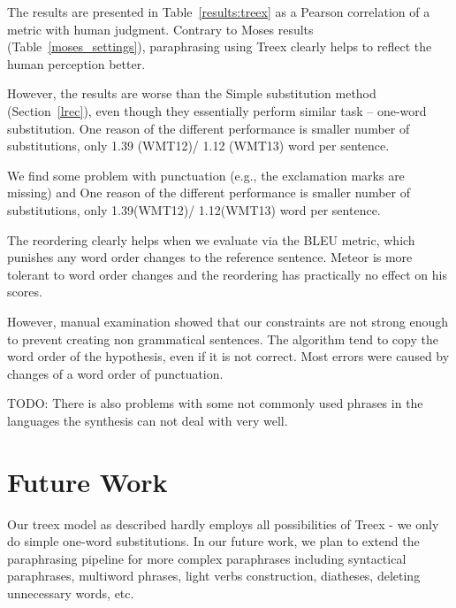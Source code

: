 \documentclass[11pt]{article}
\def\Tref#1{Table~\ref{#1}}
\def\Sref#1{Section~\ref{#1}}
\begin{document}
The results are presented in \Tref{results:treex} as a Pearson correlation of a 
metric with human judgment. Contrary to Moses results (\Tref{moses_settings}), 
paraphrasing using Treex clearly helps to reflect the human perception better. 

However, the results are worse than the Simple substitution method (\Sref{lrec}),
even though they essentially perform similar task -- one-word substitution. One 
reason of the different performance is smaller number of substitutions, only 
1.39 (WMT12)/ 1.12 (WMT13) word per sentence.

We find some problem with punctuation (e.g., the exclamation marks are missing)
and 
One reason of the different performance is smaller number of substitutions, 
only 1.39(WMT12)/ 1.12(WMT13) word per sentence.


The reordering clearly helps when we evaluate via the BLEU metric, which 
punishes any word order changes to the reference sentence. Meteor is more
tolerant to word order changes and the reordering has practically no effect 
on his scores.

However, manual examination showed that our constraints are not strong enough 
to prevent creating non grammatical sentences. The algorithm tend to copy the
word order of the hypothesis, even if it is not correct. Most errors were caused
by changes of a word order of punctuation. 

TODO: There is also problems with some not commonly used phrases in the languages the synthesis
can not deal with very well.





\section{Future Work}
Our treex model as described hardly employs all possibilities of Treex - we
only do simple one-word substitutions. In our future work, we plan to extend 
the paraphrasing pipeline for more complex paraphrases including syntactical 
paraphrases, multiword phrases, light verbs construction, diatheses, deleting 
unnecessary words, etc.
\end{document}
